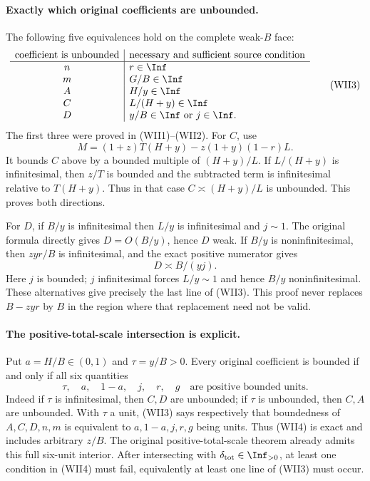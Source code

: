 \paragraph{Exactly which original coefficients are unbounded.}
The following five equivalences hold on the complete weak-$B$ face:
\[
\begin{array}{c|l}
\text{coefficient is unbounded}&\text{necessary and sufficient source condition}\\ \hline
n&r\in\Inf\\
m&G/B\in\Inf\\
A&H/y\in\Inf\\
C&L/(H+y)\in\Inf\\
D&y/B\in\Inf\ \text{or}\ j\in\Inf.
\end{array}                                                     \tag{WII3}
\]
The first three were proved in (WII1)--(WII2). For $C$, use
\[
 M=(1+z)T(H+y)-z(1+y)(1-r)L.
\]
It bounds $C$ above by a bounded multiple of $(H+y)/L$. If
$L/(H+y)$ is infinitesimal, then $z/T$ is bounded and the subtracted
term is infinitesimal relative to $T(H+y)$. Thus in that case
$C\asymp(H+y)/L$ is unbounded. This proves both directions.

For $D$, if $B/y$ is infinitesimal then $L/y$ is infinitesimal and
$j\sim1$. The original formula directly gives $D=O(B/y)$, hence
$D$ weak. If $B/y$ is noninfinitesimal, then $zyr/B$ is infinitesimal,
and the exact positive numerator gives
\[
 D\asymp B/(yj).
\]
Here $j$ is bounded; $j$ infinitesimal forces $L/y\sim1$ and hence
$B/y$ noninfinitesimal. These alternatives give precisely the last
line of (WII3). This proof never replaces $B-zyr$ by $B$ in the
region where that replacement need not be valid.

\paragraph{The positive-total-scale intersection is explicit.}
Put $a=H/B\in(0,1)$ and $\tau=y/B>0$. Every original coefficient is
bounded if and only if all six quantities
\[
 \tau,\quad a,\quad1-a,\quad j,\quad r,\quad g
 \quad\text{are positive bounded units}.          \tag{WII4}
\]
Indeed if $\tau$ is infinitesimal, then $C,D$ are unbounded; if
$\tau$ is unbounded, then $C,A$ are unbounded. With $\tau$ a unit,
(WII3) says respectively that boundedness of $A,C,D,n,m$ is
equivalent to $a,1-a,j,r,g$ being units. Thus (WII4) is exact and
includes arbitrary $z/B$. The original positive-total-scale theorem
already admits this full six-unit interior. After intersecting with
$\delta_{\rm tot}\in\Inf_{>0}$, at least one condition in (WII4)
must fail, equivalently at least one line of (WII3) must occur.

